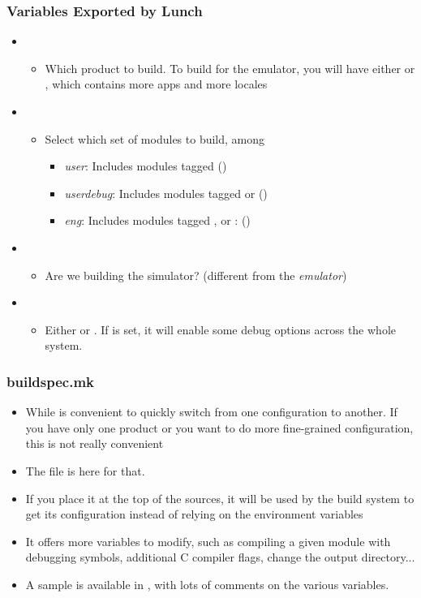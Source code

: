 \begin{frame}
  \frametitle{Variables Exported by Lunch}
  \begin{itemize}
  \item {}
    \begin{itemize}
    \item Which product to build. To build for the emulator, you will
      have either  or , which contains more
      apps and more locales
    \end{itemize}
  \item {}
    \begin{itemize}
    \item Select which set of modules to build, among
      \begin{itemize}
      \item \emph{user}: Includes modules tagged 
        ()
      \item \emph{userdebug}: Includes modules tagged  or
         ()
      \item \emph{eng}: Includes modules tagged , 
        or : ()
      \end{itemize}
    \end{itemize}
  \item {}
    \begin{itemize}
    \item Are we building the simulator? (different from the \emph{emulator})
    \end{itemize}
  \item {}
    \begin{itemize}
    \item Either  or . If  is
      set, it will enable some debug options across the whole system.
    \end{itemize}
  \end{itemize}
\end{frame}

\begin{frame}
  \frametitle{buildspec.mk}
  \begin{itemize}
  \item While  is convenient to quickly switch from one
    configuration to another. If you have only one product or
    you want to do more fine-grained configuration, this is not
    really convenient
  \item The file  is here for that.
  \item If you place it at the top of the sources, it will be used by
    the build system to get its configuration instead of relying on
    the environment variables
  \item It offers more variables to modify, such as compiling a
    given module with debugging symbols, additional C compiler
    flags, change the output directory...
  \item A sample is available in ,
    with lots of comments on the various variables.
  \end{itemize}
\end{frame}
